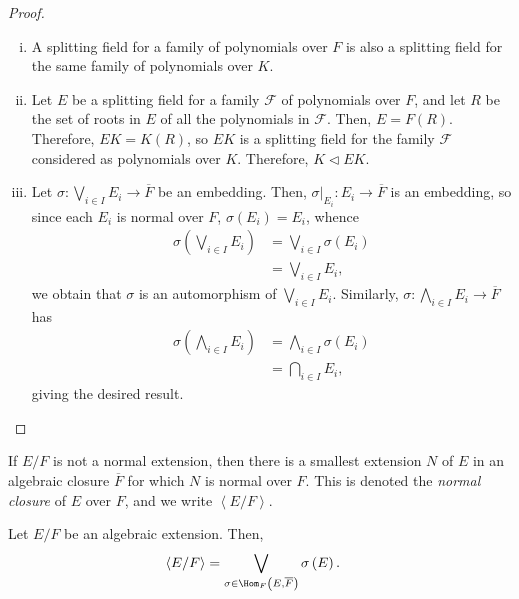\documentclass[10pt]{mypackage}
\begin{document}
\begin{proof}\hfill
  \begin{enumerate}[(i)]
    \item A splitting field for a family of polynomials over $F$ is also a splitting field for the same family of polynomials over $K$.
    \item Let $E$ be a splitting field for a family $ \mathcal{F} $ of polynomials over $F$, and let $R$ be the set of roots in $E$ of all the polynomials in $ \mathcal{F} $. Then, $E = F(R)$. Therefore, $EK = K(R)$, so $EK$ is a splitting field for the family $ \mathcal{F} $ considered as polynomials over $K$. Therefore, $K\triangleleft EK$.
    \item Let $\sigma\colon \bigvee_{i\in I}E_i\rightarrow \overline{F}$ be an embedding. Then, $\sigma|_{E_i}\colon E_i\rightarrow \overline{F}$ is an embedding, so since each $E_i$ is normal over $F$, $\sigma\left( E_i \right) = E_i$, whence
      \begin{align*}
        \sigma\left( \bigvee_{i\in I}E_i \right) &= \bigvee_{i\in I}\sigma\left( E_i \right)\\
                                                 &= \bigvee_{i\in I}E_i,
      \end{align*}
      we obtain that $\sigma$ is an automorphism of $ \bigvee_{i\in I}E_i $. Similarly, $\sigma\colon \bigwedge_{i\in I}E_i\rightarrow \overline{F}$ has
      \begin{align*}
        \sigma\left( \bigwedge_{i\in I}E_i \right) &= \bigwedge_{i\in I}\sigma\left( E_i \right)\\
                                                   &= \bigcap_{i\in I}E_i,
      \end{align*}
      giving the desired result.
  \end{enumerate}
\end{proof}
\begin{definition}
  If $E/F$ is not a normal extension, then there is a smallest extension $N$ of $E$ in an algebraic closure $ \overline{F} $ for which $N$ is normal over $F$. This is denoted the \textit{normal closure} of $E$ over $F$, and we write $ \left\langle E/F \right\rangle $.
\end{definition}
\begin{proposition}
  Let $E/F$ be an algebraic extension. Then,
  \begin{align*}
    \left\langle E/F \right\rangle &= \bigvee_{\sigma\in \Hom_{F}\left( E, \overline{F} \right)} \sigma\left( E \right).
  \end{align*}
\end{proposition}
\end{document}
